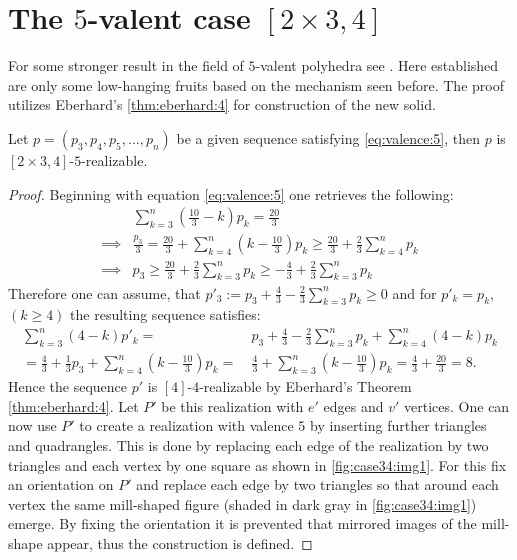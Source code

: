 \section{The $5$-valent case $[2 \times 3, 4]$}
For some stronger result in the field of $5$-valent polyhedra see \cite{trenkler1975face}. Here established are only some low-hanging fruits based on the mechanism seen before. The proof utilizes Eberhard's \autoref{thm:eberhard:4} for construction of the new solid.
\begin{theorem}
  Let $p = (p_3, p_4, p_5, \dots, p_n)$ be a given sequence satisfying \autoref{eq:valence:5}, then $p$ is $[2\times3, 4]$-$5$-realizable.
  \begin{proof}
    Beginning with equation \autoref{eq:valence:5} one retrieves the following:
    \begin{align*}
      &\sum_{k=3}^n \left( \frac{10}{3} - k \right) p_k = \frac{20}{3} \\
      \implies & \frac{p_3}{3} = \frac{20}{3} + \sum_{k=4}^n \left(k - \frac{10}{3} \right) p_k \geq \frac{20}{3} + \frac{2}{3} \sum_{k=4}^n p_k \\
      \implies & p_3 \geq \frac{20}{3} + \frac{2}{3} \sum_{k=3}^n p_k \geq - \frac{4}{3} + \frac{2}{3} \sum_{k=3}^n p_k
    \end{align*}
    Therefore one can assume, that $p'_3 := p_3 + \frac{4}{3} - \frac{2}{3} \sum_{k=3}^n p_k \geq 0$ and for $p'_k = p_k$, $(k\geq 4)$ the resulting sequence satisfies:
    \begin{align*}
      \sum_{k=3}^n (4 - k) p'_k =&~ p_3 + \frac{4}{3} - \frac{2}{3} \sum_{k=3}^n p_k + \sum_{k=4}^n (4 - k) p_k \\
      = \frac{4}{3} + \frac{1}{3} p_3 + \sum_{k=4}^n \left(k - \frac{10}{3} \right) p_k =&~ \frac{4}{3} + \sum_{k=3}^n \left(k - \frac{10}{3} \right) p_k = \frac{4}{3} + \frac{20}{3} = 8.
    \end{align*}
    Hence the sequence $p'$ is $[4]$-$4$-realizable by Eberhard's Theorem \autoref{thm:eberhard:4}. Let $P'$ be this realization with $e'$ edges and $v'$ vertices. One can now use $P'$ to create a realization with valence $5$ by inserting further triangles and quadrangles. This is done by replacing each edge of the realization by two triangles and each vertex by one square as shown in \autoref{fig:case34:img1}. For this fix an orientation on $P'$ and replace each edge by two triangles so that around each vertex the same mill-shaped figure (shaded in dark gray in \autoref{fig:case34:img1}) emerge. By fixing the orientation it is prevented that mirrored images of the mill-shape appear, thus the construction is defined.


\end{proof}
\end{theorem}

